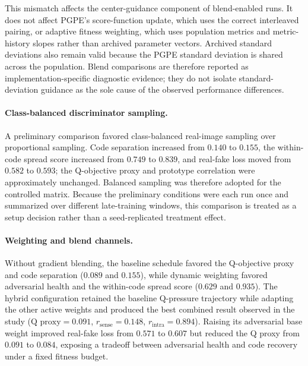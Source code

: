 This mismatch affects the center-guidance component of blend-enabled runs. It does not affect PGPE's score-function update, which uses the correct interleaved pairing, or adaptive fitness weighting, which uses population metrics and metric-history slopes rather than archived parameter vectors. Archived standard deviations also remain valid because the PGPE standard deviation is shared across the population. Blend comparisons are therefore reported as implementation-specific diagnostic evidence; they do not isolate standard-deviation guidance as the sole cause of the observed performance differences.

\paragraph{Class-balanced discriminator sampling.}
A preliminary comparison favored class-balanced real-image sampling over proportional sampling. Code separation increased from $0.140$ to $0.155$, the within-code spread score increased from $0.749$ to $0.839$, and real-fake loss moved from $0.582$ to $0.593$; the Q-objective proxy and prototype correlation were approximately unchanged. Balanced sampling was therefore adopted for the controlled matrix. Because the preliminary conditions were each run once and summarized over different late-training windows, this comparison is treated as a setup decision rather than a seed-replicated treatment effect.

\paragraph{Weighting and blend channels.}
Without gradient blending, the baseline schedule favored the Q-objective proxy and code separation ($0.089$ and $0.155$), while dynamic weighting favored adversarial health and the within-code spread score ($0.629$ and $0.935$). The hybrid configuration retained the baseline Q-pressure trajectory while adapting the other active weights and produced the best combined result observed in the study ($\text{Q proxy}=0.091$, $r_{\text{sense}}=0.148$, $r_{\text{intra}}=0.894$). Raising its adversarial base weight improved real-fake loss from $0.571$ to $0.607$ but reduced the Q proxy from $0.091$ to $0.084$, exposing a tradeoff between adversarial health and code recovery under a fixed fitness budget.

